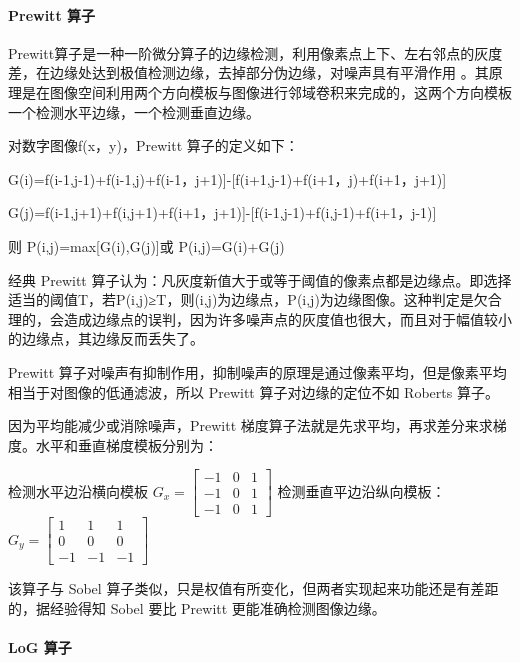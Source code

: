 \documentclass[
]{article}
\begin{document}
\hypertarget{header-n63}{%
\paragraph{Prewitt 算子}\label{header-n63}}

Prewitt算子是一种一阶微分算子的边缘检测，利用像素点上下、左右邻点的灰度差，在边缘处达到极值检测边缘，去掉部分伪边缘，对噪声具有平滑作用
。其原理是在图像空间利用两个方向模板与图像进行邻域卷积来完成的，这两个方向模板一个检测水平边缘，一个检测垂直边缘。

对数字图像f(x，y)，Prewitt 算子的定义如下：

G(i)=\textbar{[}f(i-1,j-1)+f(i-1,j)+f(i-1，j+1){]}-{[}f(i+1,j-1)+f(i+1，j)+f(i+1，j+1){]}\textbar{}

G(j)=\textbar{[}f(i-1,j+1)+f(i,j+1)+f(i+1，j+1){]}-{[}f(i-1,j-1)+f(i,j-1)+f(i+1，j-1){]}\textbar{}

则 P(i,j)=max{[}G(i),G(j){]}或 P(i,j)=G(i)+G(j)

经典 Prewitt
算子认为：凡灰度新值大于或等于阈值的像素点都是边缘点。即选择适当的阈值T，若P(i,j)≥T，则(i,j)为边缘点，P(i,j)为边缘图像。这种判定是欠合理的，会造成边缘点的误判，因为许多噪声点的灰度值也很大，而且对于幅值较小的边缘点，其边缘反而丢失了。

Prewitt
算子对噪声有抑制作用，抑制噪声的原理是通过像素平均，但是像素平均相当于对图像的低通滤波，所以
Prewitt 算子对边缘的定位不如 Roberts 算子。

因为平均能减少或消除噪声，Prewitt
梯度算子法就是先求平均，再求差分来求梯度。水平和垂直梯度模板分别为：

检测水平边沿横向模板
\(G_{x}=\begin{bmatrix} -1 & 0 & 1\\ -1 & 0 & 1\\ -1 & 0 & 1 \end{bmatrix}\)
检测垂直平边沿纵向模板：\(G_{y}=\begin{bmatrix} 1 & 1 & 1\\ 0 & 0 & 0\\ -1 & -1 & -1 \end{bmatrix}\)

该算子与 Sobel
算子类似，只是权值有所变化，但两者实现起来功能还是有差距的，据经验得知
Sobel 要比 Prewitt 更能准确检测图像边缘。

\hypertarget{header-n74}{%
\paragraph{LoG 算子}\label{header-n74}}
\end{document}
